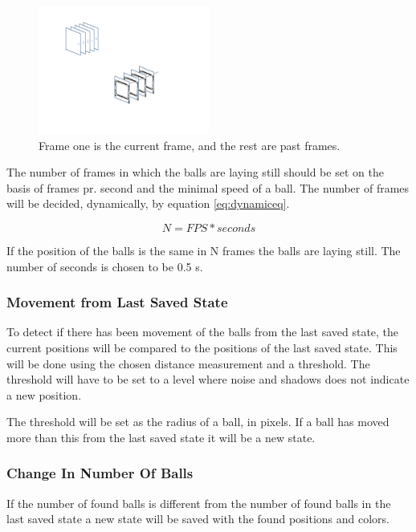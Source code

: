 \begin{figure}[htpb]
\begin{center}
\leavevmode
\includegraphics[width=0.5\textwidth]{images/image_seq_numbers}
\end{center}
\caption{Frame one is the current frame, and the rest are past frames.}
\label{fig:manyframes}
\end{figure}

The number of frames in which the balls are laying still should be set on the basis of frames pr. second and the minimal speed of a ball. The number of frames will be decided, dynamically, by equation \ref{eq:dynamiceq}.

\begin{equation}
N = FPS * seconds
\label{eq:dynamiceq}
\end{equation}

If the position of the balls is the same in N frames the balls are laying still. The number of seconds is chosen to be 0.5 s. 

\subsubsection{Movement from Last Saved State}
To detect if there has been movement of the balls from the last saved state, the current positions will be compared to the positions of the last saved state. This will be done using the chosen distance measurement and a threshold. The threshold will have to be set to a level where noise and shadows does not indicate a new position.

The threshold will be set as the radius of a ball, in pixels. If a ball has moved more than this from the last saved state it will be a new state.

\subsubsection{Change In Number Of Balls}
If the number of found balls is different from the number of found balls in the last saved state a new state will be saved with the found positions and colors.